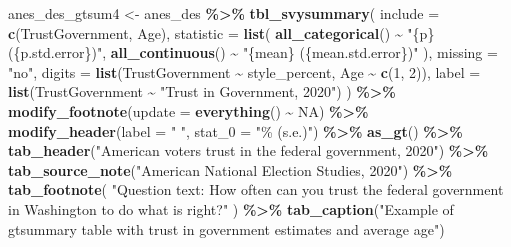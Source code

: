 \documentclass[
]{krantz}
\makeatletter
\newenvironment{Shaded}{\begin{snugshade}}{\end{snugshade}}
\newcommand{\AttributeTok}[1]{\textcolor[rgb]{0.27,0.27,0.27}{#1}}
\newcommand{\ConstantTok}[1]{\textcolor[rgb]{0.37,0.37,0.37}{#1}}
\newcommand{\DecValTok}[1]{\textcolor[rgb]{0.06,0.06,0.06}{#1}}
\newcommand{\FunctionTok}[1]{\textcolor[rgb]{0.27,0.27,0.27}{\textbf{#1}}}
\newcommand{\NormalTok}[1]{#1}
\newcommand{\OtherTok}[1]{\textcolor[rgb]{0.37,0.37,0.37}{#1}}
\newcommand{\SpecialCharTok}[1]{\textcolor[rgb]{0.43,0.43,0.43}{\textbf{#1}}}
\newcommand{\StringTok}[1]{\textcolor[rgb]{0.5,0.5,0.5}{#1}}
\newenvironment{kframe}{%
\medskip{}
\setlength{\fboxsep}{.8em}
 \def\at@end@of@kframe{}%
 \ifinner\ifhmode%
  \def\at@end@of@kframe{\end{minipage}}%
  \begin{minipage}{\columnwidth}%
 \fi\fi%
 \def\FrameCommand##1{\hskip\@totalleftmargin \hskip-\fboxsep
 \colorbox{shadecolor}{##1}\hskip-\fboxsep
     \hskip-\linewidth \hskip-\@totalleftmargin \hskip\columnwidth}%
 \MakeFramed {\advance\hsize-\width
   \@totalleftmargin\z@ \linewidth\hsize
   \@setminipage}}%
 {\par\unskip\endMakeFramed%
 \at@end@of@kframe}
\renewenvironment{Shaded}{\begin{kframe}}{\end{kframe}}
\makeatother
\begin{document}
\begin{Shaded}
\begin{Highlighting}[]
\NormalTok{anes\_des\_gtsum4 }\OtherTok{\textless{}{-}}\NormalTok{ anes\_des }\SpecialCharTok{\%\textgreater{}\%}
  \FunctionTok{tbl\_svysummary}\NormalTok{(}
    \AttributeTok{include =} \FunctionTok{c}\NormalTok{(TrustGovernment, Age),}
    \AttributeTok{statistic =} \FunctionTok{list}\NormalTok{(}
      \FunctionTok{all\_categorical}\NormalTok{() }\SpecialCharTok{\textasciitilde{}} \StringTok{"\{p\} (\{p.std.error\})"}\NormalTok{,}
      \FunctionTok{all\_continuous}\NormalTok{() }\SpecialCharTok{\textasciitilde{}} \StringTok{"\{mean\} (\{mean.std.error\})"}
\NormalTok{    ),}
    \AttributeTok{missing =} \StringTok{"no"}\NormalTok{,}
    \AttributeTok{digits =} \FunctionTok{list}\NormalTok{(TrustGovernment }\SpecialCharTok{\textasciitilde{}}\NormalTok{ style\_percent,}
\NormalTok{                  Age }\SpecialCharTok{\textasciitilde{}} \FunctionTok{c}\NormalTok{(}\DecValTok{1}\NormalTok{, }\DecValTok{2}\NormalTok{)),}
    \AttributeTok{label =} \FunctionTok{list}\NormalTok{(TrustGovernment }\SpecialCharTok{\textasciitilde{}} \StringTok{"Trust in Government, 2020"}\NormalTok{)}
\NormalTok{  ) }\SpecialCharTok{\%\textgreater{}\%}
  \FunctionTok{modify\_footnote}\NormalTok{(}\AttributeTok{update =} \FunctionTok{everything}\NormalTok{() }\SpecialCharTok{\textasciitilde{}} \ConstantTok{NA}\NormalTok{) }\SpecialCharTok{\%\textgreater{}\%}
  \FunctionTok{modify\_header}\NormalTok{(}\AttributeTok{label =} \StringTok{" "}\NormalTok{,}
                \AttributeTok{stat\_0 =} \StringTok{"\% (s.e.)"}\NormalTok{) }\SpecialCharTok{\%\textgreater{}\%}
  \FunctionTok{as\_gt}\NormalTok{() }\SpecialCharTok{\%\textgreater{}\%}
  \FunctionTok{tab\_header}\NormalTok{(}\StringTok{"American voter\textquotesingle{}s trust in the federal government, 2020"}\NormalTok{) }\SpecialCharTok{\%\textgreater{}\%}
  \FunctionTok{tab\_source\_note}\NormalTok{(}\StringTok{"American National Election Studies, 2020"}\NormalTok{) }\SpecialCharTok{\%\textgreater{}\%}
  \FunctionTok{tab\_footnote}\NormalTok{(}
    \StringTok{"Question text: How often can you trust the federal government}
\StringTok{    in Washington to do what is right?"}
\NormalTok{  ) }\SpecialCharTok{\%\textgreater{}\%}
  \FunctionTok{tab\_caption}\NormalTok{(}\StringTok{"Example of gtsummary table with trust in government}
\StringTok{              estimates and average age"}\NormalTok{)}
\end{Highlighting}
\end{Shaded}
\end{document}
